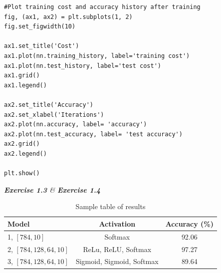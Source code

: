 \documentclass[a4paper,10pt]{article}
\begin{document}
\begin{enumerate}
\begin{lstlisting}
#Plot training cost and accuracy history after training
fig, (ax1, ax2) = plt.subplots(1, 2)
fig.set_figwidth(10)

ax1.set_title('Cost')
ax1.plot(nn.training_history, label='training cost')
ax1.plot(nn.test_history, label='test cost')
ax1.grid()
ax1.legend()

ax2.set_title('Accuracy')
ax2.set_xlabel('Iterations')
ax2.plot(nn.accuracy, label= 'accuracy')
ax2.plot(nn.test_accuracy, label= 'test accuracy')
ax2.grid()
ax2.legend()

plt.show()
\end{lstlisting}

\end{enumerate}


\hfill \break
\textit{\textbf{Exercise 1.3} \& \textbf{Exercise 1.4} }

\begin{table}[ht]
    \centering
    \caption{Sample table of results}
    \label{tab:results}
    \begin{tabular}{lcc}
        \toprule
        Model & Activation & Accuracy (\%) \\
        \midrule
        1, $[784, 10]$ & Softmax & 92.06  \\
        2, $[784, 128, 64, 10]$ & ReLu, ReLU, Softmax & 97.27 \\
        3, $[784, 128, 64, 10]$ & Sigmoid, Sigmoid, Softmax & 89.64 \\
        \bottomrule
    \end{tabular}
\end{table}
\end{document}
